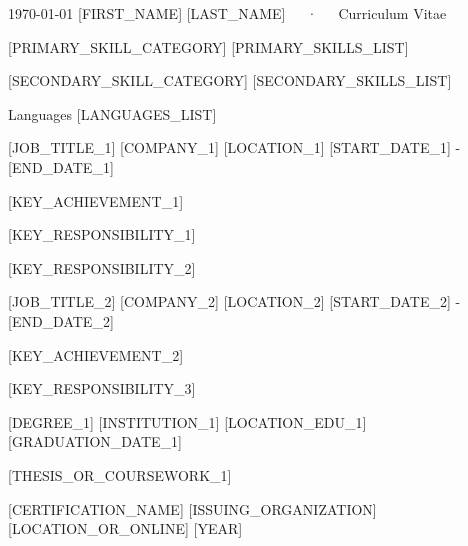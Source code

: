 \documentclass[11pt, a4paper]{awesome-cv}
\begin{document}
\makecvheader

\makecvfooter
  {\today}
  {[FIRST_NAME] [LAST_NAME]~~~·~~~Curriculum Vitae}
  {\thepage}


\begin{cvparagraph}
\end{cvparagraph}


\begin{cvskills}
  \cvskill
    {[PRIMARY_SKILL_CATEGORY]}
    {[PRIMARY_SKILLS_LIST]}

  \cvskill
    {[SECONDARY_SKILL_CATEGORY]}
    {[SECONDARY_SKILLS_LIST]}

  \cvskill
    {Languages}
    {[LANGUAGES_LIST]}
\end{cvskills}


\begin{cventries}
  \cventry
    {[JOB_TITLE_1]} %
    {[COMPANY_1]} %
    {[LOCATION_1]} %
    {[START_DATE_1] - [END_DATE_1]} %
    {
      \begin{cvitems}
        \item {[KEY_ACHIEVEMENT_1]}
        \item {[KEY_RESPONSIBILITY_1]}
        \item {[KEY_RESPONSIBILITY_2]}
      \end{cvitems}
    }

  \cventry
    {[JOB_TITLE_2]} %
    {[COMPANY_2]} %
    {[LOCATION_2]} %
    {[START_DATE_2] - [END_DATE_2]} %
    {
      \begin{cvitems}
        \item {[KEY_ACHIEVEMENT_2]}
        \item {[KEY_RESPONSIBILITY_3]}
      \end{cvitems}
    }
\end{cventries}


\begin{cventries}
  \cventry
    {[DEGREE_1]} %
    {[INSTITUTION_1]} %
    {[LOCATION_EDU_1]} %
    {[GRADUATION_DATE_1]} %
    {
      \begin{cvitems}
        \item {[THESIS_OR_COURSEWORK_1]}
      \end{cvitems}
    }
\end{cventries}


\begin{cvhonors}
  \cvhonor
    {[CERTIFICATION_NAME]} %
    {[ISSUING_ORGANIZATION]} %
    {[LOCATION_OR_ONLINE]} %
    {[YEAR]} %
\end{cvhonors}
\end{document}
